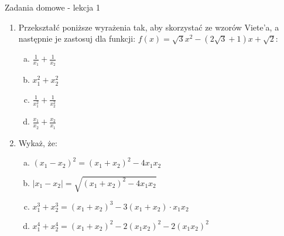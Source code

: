 \documentclass[12pt,a4paper]{article}
\begin{document}
	\begin{center}
		\LARGE Zadania domowe - lekcja 1
	\end{center}
	\vspace{1.5cm}
	
	\begin{enumerate}[1.]
		\item Przekształć poniższe wyrażenia tak, aby skorzystać ze wzorów Viete'a, a następnie je zastosuj dla funkcji: $f(x)=\sqrt{3}x^2-(2\sqrt{3}+1)x+\sqrt{2}$:
		
		\begin{enumerate}[a)]
			\item $\frac{1}{x_1}+\frac{1}{x_2}$
			\item $x_1^2+x_2^2$
			\item $\frac{1}{x_1^2}+\frac{1}{x_2^2}$
			\item $\frac{x_1}{x_2}+\frac{x_2}{x_1}$
		\end{enumerate}
	
		\item Wykaż, że:
		\begin{enumerate}[a)]
			\item $(x_1-x_2)^2=(x_1+x_2)^2-4x_1x_2$
			\item $|x_1-x_2|=\sqrt{(x_1+x_2)^2-4x_1x_2}$
			\item $x_1^3+x_2^3=(x_1+x_2)^3-3(x_1+x_2)\cdot x_1x_2$
			\item $x_1^4+x_2^4=(x_1+x_2)^2-2(x_1x_2)^2-2(x_1x_2)^2$
		\end{enumerate}
	\end{enumerate}
	
	
	
\end{document}
